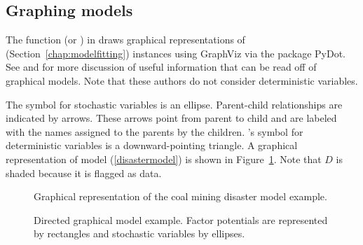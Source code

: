 \documentclass[]{jss}
\begin{document}
\subsection{Graphing models} \label{graphical}


The function  (or ) in  draws graphical representations of  (Section~\ref{chap:modelfitting}) instances using GraphViz via the  package PyDot. See \citet{dawidmarkov} and \citet{Jordan:2004p5439} for more discussion of useful information that can be read off of graphical models. Note that these authors do not consider deterministic variables.

The symbol for stochastic variables is an ellipse. Parent-child relationships are indicated by arrows. These arrows point from parent to child and are labeled with the names assigned to the parents by the children. 's symbol for deterministic variables is a downward-pointing triangle. A graphical representation of model (\ref{disastermodel}) is shown in Figure~\ref{fig:disaster-dag}. Note that $D$ is shaded because it is flagged as data.

\begin{figure}[h!]
\begin{center}
    \caption{Graphical representation of the coal mining disaster model example.}
	\label{fig:disaster-dag}
\end{center}
\end{figure}



\begin{figure}[h!]
\begin{center}
    \caption{Directed graphical model example. Factor potentials are represented by rectangles and stochastic variables by ellipses.}
    \label{fig:dgm}
\end{center}
\end{figure}
\end{document}
